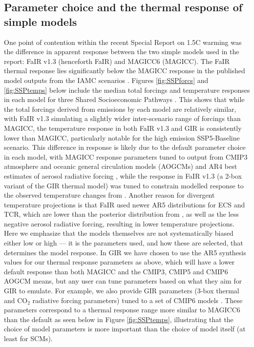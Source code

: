 \documentclass[gmd, manuscript]{copernicus}
\begin{document}
\subsection*{Parameter choice and the thermal response of simple models}
One point of contention within the recent Special Report on 1.5\textdegree C warming \citep{IPCC2018} was the difference in apparent response between the two simple models used in the report: FaIR v1.3 (henceforth FaIR) and MAGICC6 (MAGICC). The FaIR thermal response lies significantly below the MAGICC response in the published model outputs from the IAMC scenarios \citep{Huppmann:2018:scenario-data}. Figures \ref{fig:SSPforcs} and \ref{fig:SSPtemps} below include the median total forcings and temperature responses in each model for three Shared Socioeconomic Pathways \citep{Riahi2017}. This shows that while the total forcings derived from emissions by each model are relatively similar, with FaIR v1.3 simulating a slightly wider inter-scenario range of forcings than MAGICC, the temperature response in both FaIR v1.3 and GIR is consistently lower than MAGICC, particularly notable for the high emission SSP5-Baseline scenario. This difference in response is likely due to the default parameter choice in each model, with MAGICC response parameters tuned to output from CMIP3 atmosphere and oceanic general circulation models (AOGCMs) and AR4 best estimates of aerosol radiative forcing  \citep{Meinshausen2011}, while the response in FaIR v1.3 (a 2-box variant of the GIR thermal model) was tuned to constrain modelled response to the observed temperature changes from \cite{Cowtan2014} \citep{Smith2017}. Another reason for divergent temperature projections is that FaIR used newer AR5 distributions for ECS and TCR, which are lower than the posterior distribution from \cite{Meinshausen2009}, as well as the  less negative aerosol radiative forcing, resulting in lower temperature projections. Here we emphasize that the models themselves are not systematically biased either low or high --- it is the parameters used, and how these are selected, that determines the model response. In GIR we have chosen to use the AR5 synthesis values for our thermal response parameters as above, which will have a lower default response than both MAGICC and the CMIP3, CMIP5 and CMIP6 AOGCM means, but any user can tune parameters based on what they aim for GIR to emulate. For example, we also provide GIR parameters (3-box thermal and CO$_2$ radiative forcing parameters) tuned to a set of CMIP6 models \citep{Tsutsui2019}. These parameters correspond to a thermal response range more similar to MAGICC6 than the default as seen below in Figure \ref{fig:SSPtemps}, illustrating that the choice of model parameters is more important than the choice of model itself (at least for SCMs).
\end{document}
